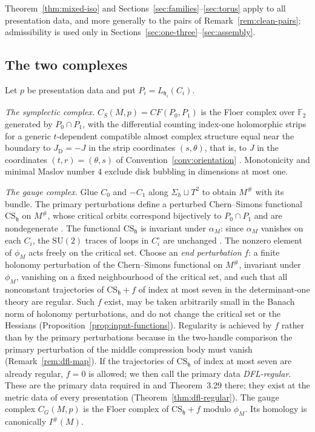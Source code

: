 \documentclass[11pt]{amsart}
\theoremstyle{definition}
\theoremstyle{remark}
\theoremstyle{plain}
\numberwithin{equation}{section}
\newcommand{\FF}{\mathbb{F}_2}
\newcommand{\SU}{\mathrm{SU}}
\newcommand{\Ish}{I^{\#}}
\newcommand{\CF}{\mathit{CF}}
\begin{document}
Theorem~\ref{thm:mixed-iso} and Sections~\ref{sec:families}--\ref{sec:torus}
apply to all presentation data, and more generally to the pairs of
Remark~\ref{rem:clean-pairs}; admissibility is used only in
Sections~\ref{sec:one-three}--\ref{sec:assembly}.

\subsection{The two complexes}\label{subsec:complexes}

Let $p$ be presentation data and put $P_i=L_{\mathfrak h_i}(C_i)$.

\emph{The symplectic complex.} $C_S(M,p)=\CF(P_0,P_1)$ is the Floer
complex over $\FF$ generated by $P_0\cap P_1$, with the differential
counting index-one holomorphic strips for a generic $t$-dependent
compatible almost complex structure equal near the boundary to $J_{\mathrm D}=-J$ in the
strip coordinates $(s,\theta)$, that is, to $J$ in the coordinates $(t,r)=(\theta,s)$ of
Convention~\ref{conv:orientation} \cite{Oh, DFL}. Monotonicity and minimal Maslov number $4$ exclude disk
bubbling in dimensions at most one.

\emph{The gauge complex.} Glue $C_0$ and $-C_1$ along $\Sigma_h\sqcup
T^2$ to obtain $M^\#$ with its bundle. The primary perturbations define a
perturbed Chern--Simons functional $\mathrm{CS}_{\mathfrak h}$ on $M^\#$, whose critical
orbits correspond bijectively to $P_0\cap P_1$ and are nondegenerate
\cite[Lemmas~2.45, 2.47]{DFL}. The functional $\mathrm{CS}_{\mathfrak h}$ is invariant
under $\alpha_M$: since $\alpha_M$ vanishes on each $C_i$, the $\SU(2)$ traces of
loops in $C_i^\circ$ are unchanged \cite[p.~19]{DFL}. The nonzero element of
$\phi_M$ acts freely on the critical set. Choose an \emph{end perturbation}
$f$: a finite holonomy perturbation of the Chern--Simons functional on $M^\#$, invariant under
$\phi_M$, vanishing on a fixed neighbourhood of the critical set, and
such that all nonconstant trajectories of $\mathrm{CS}_{\mathfrak h}+f$ of index at most seven in the determinant-one theory are regular. Such $f$ exist, may be taken
arbitrarily small in the Banach norm of holonomy perturbations, and do not change the critical set or the Hessians
(Proposition~\ref{prop:input-functions}). Regularity is achieved by $f$ rather than
by the primary perturbations because in the two-handle comparison the primary
perturbation of the middle compression body must vanish
(Remark~\ref{rem:dfl-map}). If the trajectories of $\mathrm{CS}_{\mathfrak h}$ of index at most seven
are already regular, $f=0$ is allowed; we then call the primary data
\emph{DFL-regular}. These are the primary data required in \cite[Lemma~2.56]{DFL} and
Theorem~3.29 there; they exist at the metric data of every presentation
(Theorem~\ref{thm:dfl-regular}). The gauge complex
$C_G(M,p)$ is the Floer complex of $\mathrm{CS}_{\mathfrak h}+f$ modulo $\phi_M$. Its
homology is canonically $\Ish(M)$.
\end{document}
